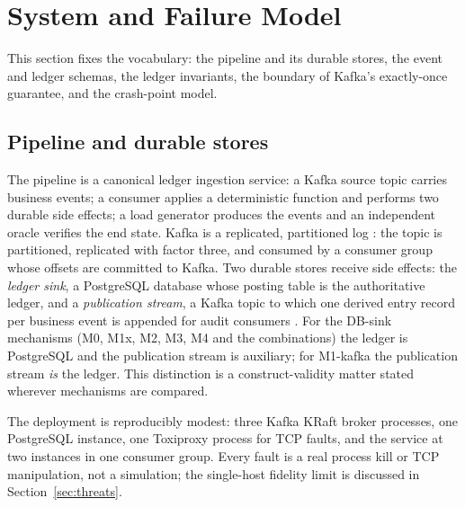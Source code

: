 
\makeatletter
{}
\makeatother

\section{System and Failure Model}
\label{sec:model}

This section fixes the vocabulary: the pipeline and its durable stores, the event and ledger
schemas, the ledger invariants, the boundary of Kafka's exactly-once guarantee, and the
crash-point model.

\subsection{Pipeline and durable stores}
\label{sec:model:pipeline}

The pipeline is a canonical ledger ingestion service: a Kafka source topic carries business
events; a consumer applies a deterministic function and performs two durable side effects; a load
generator produces the events and an independent oracle verifies the end state. Kafka is a
replicated, partitioned log \cite{kafka2015}: the topic is partitioned, replicated with factor
three, and consumed by a consumer group whose offsets are committed to Kafka. Two durable stores receive side effects: the \emph{ledger sink}, a
PostgreSQL database whose posting table is the authoritative ledger, and a \emph{publication
stream}, a Kafka topic to which one derived entry record per business event is appended for audit
consumers \cite{sax2018,eventsourcing2022}. For the DB-sink mechanisms (M0, M1x, M2, M3, M4 and
the combinations) the ledger is PostgreSQL and the publication stream is auxiliary; for M1-kafka
the publication stream \emph{is} the ledger. This distinction is a construct-validity matter
stated wherever mechanisms are compared.

The deployment is reproducibly modest: three Kafka KRaft broker processes, one PostgreSQL
instance, one Toxiproxy process for TCP faults, and the service at two instances in one consumer
group. Every fault is a real process kill or TCP manipulation, not a simulation; the single-host
fidelity limit is discussed in Section~\ref{sec:threats}.


